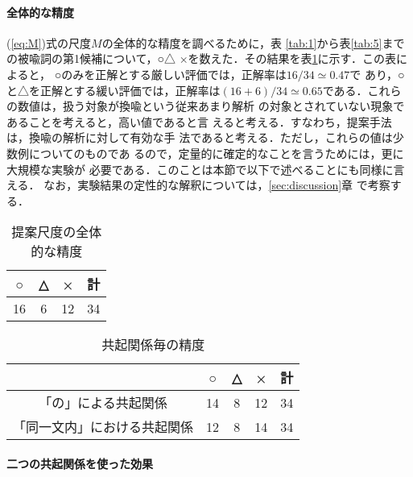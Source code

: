 \paragraph{全体的な精度}

(\ref{eq:M})式の尺度$M$の全体的な精度を調べるために，表
\ref{tab:1}から表\ref{tab:5}までの被喩詞の第1候補について，○△
×を数えた．その結果を表\ref{tab:total}に示す．この表によると，
○のみを正解とする厳しい評価では，正解率は$16/34 \simeq 0.47$で
あり，○と△を正解とする緩い評価では，正解率は$(16+6)/34 \simeq
0.65$である．これらの数値は，扱う対象が換喩という従来あまり解析
の対象とされていない現象であることを考えると，高い値であると言
えると考える．すなわち，提案手法は，換喩の解析に対して有効な手
法であると考える．ただし，これらの値は少数例についてのものであ
るので，定量的に確定的なことを言うためには，更に大規模な実験が
必要である．このことは本節で以下で述べることにも同様に言える．
なお，実験結果の定性的な解釈については，\ref{sec:discussion}章
で考察する．

\begin{table}[htbp]
  \begin{center}
    
    \caption{提案尺度の全体的な精度}
    
    \begin{tabular}{|c|c|c|c|}
      \hline
      ○ & △ & × & 計\\
      \hline
      16 & 6 & 12 & 34\\
      \hline
    \end{tabular}
    \label{tab:total}
  \end{center}
\end{table}

\begin{table}[htbp]
  \begin{center}
    
    \caption{共起関係毎の精度}
    
    \begin{tabular}{|c|c|c|c|c|}
      \hline
      &○ & △ & × & 計\\
      \hline
      「の」による共起関係 & 14 & 8 & 12 & 34\\
      「同一文内」における共起関係 & 12 & 8 & 14 & 34\\
      \hline
    \end{tabular}
    \label{tab:cmp}
  \end{center}
\end{table}

\paragraph{二つの共起関係を使った効果}

